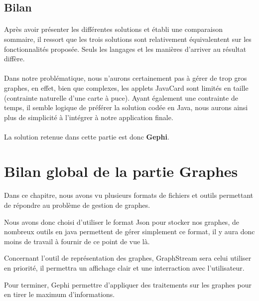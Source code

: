   
  \subsection{Bilan}
  
  \paragraph{}
  Après avoir présenter les différentes solutions et établi une comparaison sommaire, il ressort que les trois solutions sont relativement équivalentent sur les fonctionnalités proposée. Seuls les langages et les manières d'arriver au résultat diffère.
  
  \paragraph{}
  Dans notre problématique, nous n'aurons certainement pas à gérer de trop gros graphes, en effet, bien que complexes, les applets JavaCard sont limités en taille (contrainte naturelle d'une carte à puce). Ayant également une contrainte de temps, il semble logique de préférer la solution codée en Java, nous aurons ainsi plus de simplicité à l'intégrer à notre application finale.
  
  \paragraph{}La solution retenue dans cette partie est donc \textbf{Gephi}.
  
  \section{Bilan global de la partie Graphes}
  
  \paragraph{}
  Dans ce chapitre, nous avons vu plusieurs formats de fichiers et  outils permettant de répondre au problème de gestion de graphes.
  
  Nous avons donc choisi d'utiliser le format Json pour stocker nos graphes, de nombreux outils en java permettent de gérer simplement ce format, il y aura donc moins de travail à fournir de ce point de vue là.
  
  Concernant l'outil de représentation des graphes, GraphStream sera celui utiliser en priorité, il permettra un affichage clair et une interraction avec l'utilisateur.
  
  Pour terminer, Gephi permettre d'appliquer des traitements sur les graphes pour en tirer le maximum d'informations.
  
  
